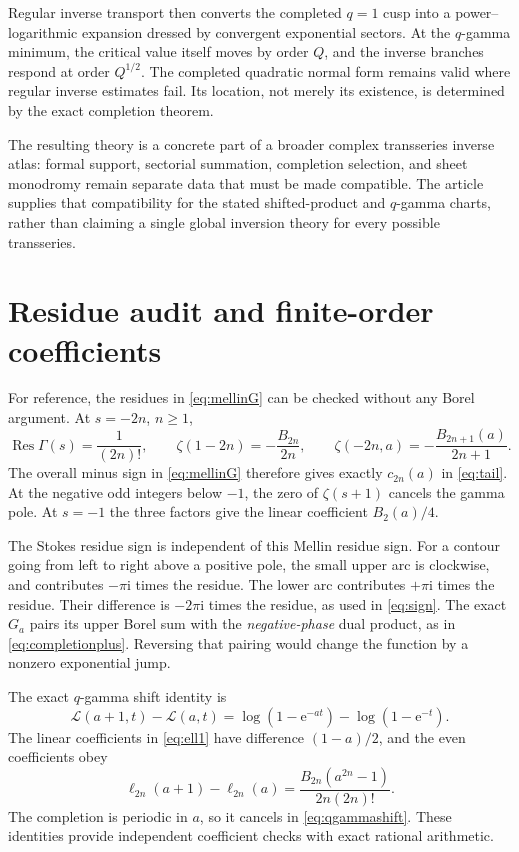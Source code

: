 \documentclass[11pt,a4paper]{article}
\numberwithin{equation}{section}
\theoremstyle{definition}
\theoremstyle{remark}
\newcommand{\ii}{\mathrm i}
\newcommand{\e}{\mathrm e}
\newcommand{\cL}{\mathcal L}
\newcommand{\Res}{\operatorname*{Res}}
\begin{document}
Regular inverse transport then converts the completed $q=1$ cusp into
a power--logarithmic expansion dressed by convergent exponential
sectors. At the $q$-gamma minimum, the critical value itself moves by
order $Q$, and the inverse branches respond at order $Q^{1/2}$. The
completed quadratic normal form remains valid where regular inverse
estimates fail. Its location, not merely its existence, is determined
by the exact completion theorem.

The resulting theory is a concrete part of a broader complex
transseries inverse atlas: formal support, sectorial summation,
completion selection, and sheet monodromy remain separate data that
must be made compatible. The article supplies that compatibility for
the stated shifted-product and $q$-gamma charts, rather than claiming
a single global inversion theory for every possible transseries.

\appendix
\section{Residue audit and finite-order coefficients}
\label{app:residues}
For reference, the residues in \eqref{eq:mellinG} can be checked
without any Borel argument. At $s=-2n$, $n\geq1$,
\[
 \Res\Gamma(s)=\frac1{(2n)!},\qquad
 \zeta(1-2n)=-\frac{B_{2n}}{2n},\qquad
 \zeta(-2n,a)=-\frac{B_{2n+1}(a)}{2n+1}.
\]
The overall minus sign in \eqref{eq:mellinG} therefore gives exactly
$c_{2n}(a)$ in \eqref{eq:tail}. At the negative odd integers below
$-1$, the zero of $\zeta(s+1)$ cancels the gamma pole. At $s=-1$ the
three factors give the linear coefficient $B_2(a)/4$.

The Stokes residue sign is independent of this Mellin residue sign.
For a contour going from left to right above a positive pole, the
small upper arc is clockwise, and contributes $-\pi\ii$ times the
residue. The lower arc contributes $+\pi\ii$ times the residue.
Their difference is $-2\pi\ii$ times the residue, as used in
\eqref{eq:sign}. The exact $G_a$ pairs its upper Borel sum with the
\emph{negative-phase} dual product, as in
\eqref{eq:completionplus}. Reversing that pairing would change the
function by a nonzero exponential jump.

The exact $q$-gamma shift identity is
\begin{equation}
 \cL(a+1,t)-\cL(a,t)
 =\log(1-\e^{-at})-\log(1-\e^{-t}).
 \label{eq:qgammashift}
\end{equation}
The linear coefficients in \eqref{eq:ell1} have difference $(1-a)/2$,
and the even coefficients obey
\begin{equation}
 \ell_{2n}(a+1)-\ell_{2n}(a)
 =\frac{B_{2n}(a^{2n}-1)}{2n(2n)!}.
 \label{eq:ellshift}
\end{equation}
The completion is periodic in $a$, so it cancels in
\eqref{eq:qgammashift}. These identities provide independent
coefficient checks with exact rational arithmetic.
\end{document}
